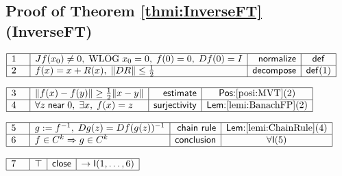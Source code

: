 \documentclass[11pt,reqno]{amsart}
\begin{document}
	\subsection*{Proof of Theorem \protect\ref{thmi:InverseFT} (\textsf{InverseFT})}
	\noindent$\begin{array}{|m{0.5cm}|l|r|c|}
	\hline
	1 & Jf(x_{0})\neq0,\;\mathrm{WLOG}\;x_{0}=0,\;f(0)=0,\;Df(0)=I & \mathsf{normalize} & \mathsf{def} \\ \hline
	2 & f(x)=x+R(x),\;\|DR\|\le\tfrac12 & \mathsf{decompose} & \mathsf{def}(1) \\ \hline
	\end{array}$
	\par\nointerlineskip\noindent$\begin{array}{|m{0.5cm}|l|r|c|}
	\hline
	3 & \|f(x)-f(y)\|\ge\tfrac12\|x-y\| & \mathsf{estimate} & \textsf{Pos:}\ref{posi:MVT}(2) \\ \hline
	4 & \forall z\;\mathsf{near}\;0,\;\exists x,\;f(x)=z & \mathsf{surjectivity} & \textsf{Lem:}\ref{lemi:BanachFP}(2) \\ \hline
	\end{array}$
	\par\nointerlineskip\noindent$\begin{array}{|m{0.5cm}|l|r|c|}
	\hline
	5 & g:=f^{-1},\;Dg(z)=Df(g(z))^{-1} & \mathsf{chain\ rule} & \textsf{Lem:}\ref{lemi:ChainRule}(4) \\ \hline
	6 & f\in C^{k}\Rightarrow g\in C^{k} & \mathsf{conclusion} & \forall\mathsf{I}(5) \\ \hline
	\end{array}$
	\par\nointerlineskip\noindent$\begin{array}{|m{0.5cm}|l|r|c|}
	\hline
	7 & \top & \mathsf{close} & \to\mathsf{I}(1,\dots,6) \\ \hline
	\end{array}$
	\medskip
	
\end{document}
